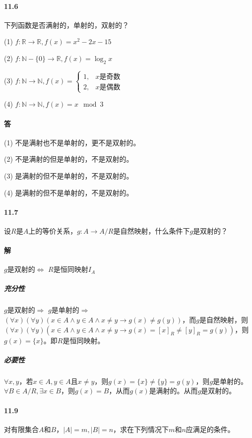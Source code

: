 \documentclass[UTF8]{ctexart}
\newcommand{\snatural}{\mathbb{N}}
\newcommand{\sreal}{\mathbb{R}}
\begin{document}
\paragraph{11.6} \label{11.6}
    下列函数是否满射的，单射的，双射的？
    
    (1) $f: \sreal \rightarrow \sreal, f(x) = x^2 - 2x - 15$

    (2) $f: \snatural - \{ 0 \} \rightarrow \sreal, f(x) = \log_2 x$
    
    (3) $f: \snatural \rightarrow \snatural, f(x) = \left \{ \begin{aligned} 1, & x \text{是奇数} \\ 2, & x \text{是偶数}\end{aligned} \right.$
    
    (4) $f: \snatural \rightarrow \snatural, f(x) = x \mod 3 $

\paragraph{答}
    (1) 不是满射也不是单射的，更不是双射的。

    (2) 不是满射的但是单射的，不是双射的。

    (3) 是满射的但不是单射的，不是双射的。

    (4) 是满射的但不是单射的，不是双射的。

\paragraph{11.7} \label{11.7}
    设$R$是$A$上的等价关系，$g: A \rightarrow A / R$是自然映射，什么条件下$g$是双射的？

\paragraph{解}
    $g$是双射的$\Longleftrightarrow$ $R$是恒同映射$I_A$
    \subparagraph{充分性}
        $g$是双射的$\Longrightarrow$ $g$是单射的$\Longrightarrow$ $ ( \forall x) ( \forall y)(x \in A \land y \in A \land x \neq y \longrightarrow g(x) \neq g(y))$，而$g$是自然映射，则$ ( \forall x) ( \forall y)(x \in A \land y \in A \land x \neq y \longrightarrow g(x) = [x]_R \neq [y]_R = g(y))$，则$g(x) = \{x\}$。即$R$是恒同映射。
    \subparagraph{必要性}
        $\forall x,y$，若$x \in A, y \in A$且$x \neq y$，则$g(x) = \{x\} \neq \{y\} = g(y)$，则$g$是单射的。$\forall B \in A/R, \exists x \in B$，则$g(x)=B$，从而$g(x)$是满射的。从而$g$是双射的。

\paragraph{11.9} \label{11.9}
    对有限集合$A$和$B$，$|A|=m, |B|=n$，求在下列情况下$m$和$n$应满足的条件。
\end{document}
